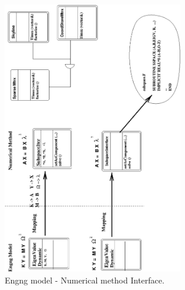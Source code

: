 \documentclass[a4paper]{article}
\begin{document}
\begin{figure}[tb]
\else
\centerline{\includegraphics[width=0.7\textwidth]{engng.eps}}
\fi
\caption{Engng model - Numerical method Interface.}
\label{engngNummet2fig}
\end{figure}
\end{document}
